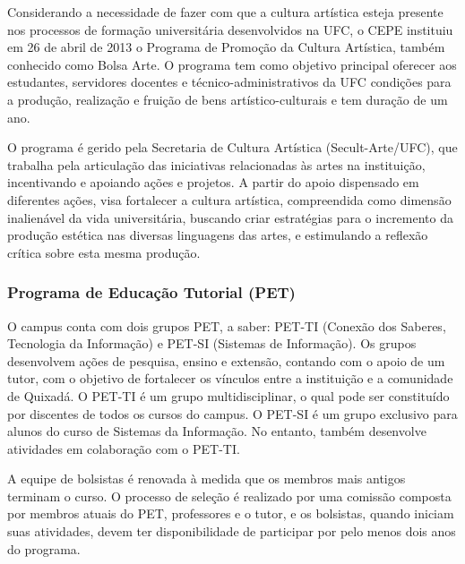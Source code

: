 Considerando a necessidade de fazer com que a cultura artística esteja presente nos processos de formação universitária desenvolvidos na UFC, o CEPE instituiu  em 26 de abril de 2013 o Programa de Promoção da Cultura Artística, também conhecido como Bolsa Arte. O programa tem como objetivo principal oferecer aos estudantes, servidores docentes e técnico-administrativos da UFC condições para a produção, realização e fruição de bens artístico-culturais e tem duração de um ano.

O programa é gerido pela Secretaria de Cultura Artística (Secult-Arte/UFC), que trabalha pela articulação das iniciativas relacionadas às artes na instituição, incentivando e apoiando ações e projetos. A partir do apoio dispensado em diferentes ações, visa fortalecer a cultura artística, compreendida como dimensão inalienável da vida universitária, buscando criar estratégias para o incremento da produção estética nas diversas linguagens das artes, e estimulando a reflexão crítica sobre esta mesma produção.

\subsubsection{Programa de Educação Tutorial (PET)}

O campus conta com dois grupos PET, a saber: PET-TI (Conexão dos Saberes, Tecnologia da Informação) e PET-SI (Sistemas de Informação). Os grupos desenvolvem ações de pesquisa, ensino e extensão, contando com o apoio de um tutor, 
com o objetivo de fortalecer os vínculos entre a instituição e a comunidade de Quixadá. O PET-TI é um grupo multidisciplinar, o qual pode ser constituído por discentes de todos os cursos do campus. O PET-SI é um grupo exclusivo para alunos do curso de Sistemas da Informação. No entanto, também desenvolve atividades em colaboração com o PET-TI.  %

A equipe de bolsistas é renovada à medida que os membros mais antigos terminam o curso. O processo de seleção é realizado por uma comissão composta por membros atuais do PET, professores e o tutor, e os bolsistas, quando iniciam suas atividades, devem ter disponibilidade de participar por pelo menos dois anos do programa.

